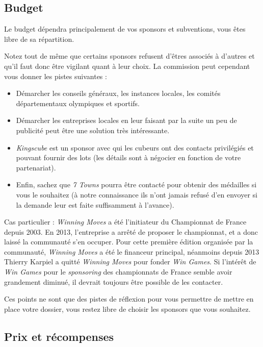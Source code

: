 \documentclass[a4paper,12pt]{scrartcl}
\begin{document}
\subsection*{Budget}


Le budget dépendra principalement de vos sponsors et subventions, vous êtes libre de sa répartition.

Notez tout de même que certains sponsors refusent d'êtres associés à d'autres et qu'il
faut donc être vigilant quant à leur choix. La commission peut cependant vous donner
les pistes suivantes :

\begin{itemize}
    \item Démarcher les conseils généraux, les instances locales, les comités départementaux
	olympiques et sportifs.
    \item Démarcher les entreprises locales en leur faisant par la suite un peu de
	publicité peut être une solution très intéressante.
    \item \emph{Kingscube} est un sponsor avec qui les cubeurs ont des contacts
	privilégiés et pouvant fournir des lots (les détails sont à négocier en
	fonction de votre partenariat).
    \item Enfin, sachez que \emph{7 Towns} pourra être contacté pour obtenir des médailles
	si vous le souhaitez (à notre connaissance ils n'ont jamais refusé d'en envoyer
	si la demande leur est faite suffisamment à l'avance).
\end{itemize}



Cas particulier : \emph{Winning Moves} a été l'initiateur du Championnat de France
depuis 2003. En 2013, l’entreprise a arrêté de proposer le championnat, et a donc
laissé la communauté s’en occuper. 
Pour cette première édition organisée par la communauté, \emph{Winning Moves} a été le financeur principal,
néanmoins depuis 2013 Thierry Karpiel a quitté \emph{Winning Moves} pour fonder \emph{Win Games}.
Si l'intérêt de \emph{Win Games} pour le \emph{sponsoring} des championnats de France
semble avoir grandement diminué, il devrait toujours être possible de les contacter.  

Ces points ne sont que des pistes de réflexion pour vous permettre de mettre en place
votre dossier, vous restez libre de choisir les sponsors que vous souhaitez.


\subsection*{Prix et récompenses}
\end{document}
